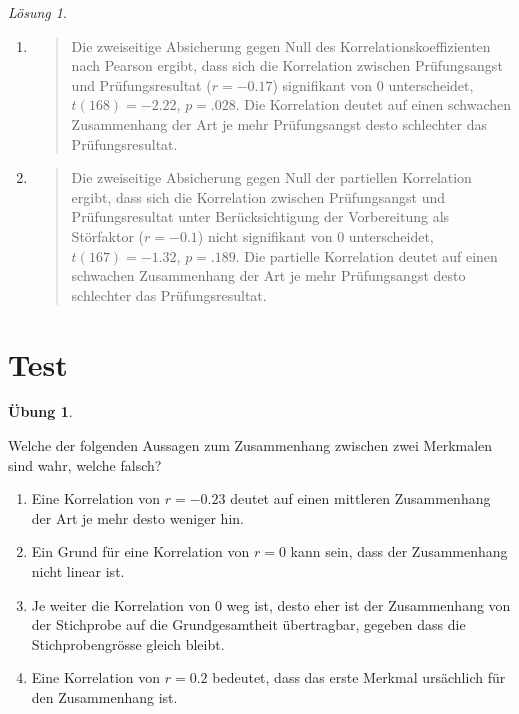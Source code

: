\documentclass[
]{book}
\providecommand{\tightlist}{%
  \setlength{\itemsep}{0pt}\setlength{\parskip}{0pt}}
\theoremstyle{definition}
\theoremstyle{definition}
\theoremstyle{definition}
\newtheorem{exercise}{Übung}[chapter]
\theoremstyle{definition}
\theoremstyle{remark}
\newtheorem*{solution}{Lösung}
\begin{document}
\begin{solution}
\begin{enumerate}
\def\labelenumi{\alph{enumi})}
\item
  \begin{quote}
  Die zweiseitige Absicherung gegen Null des Korrelationskoeffizienten nach Pearson ergibt, dass sich die Korrelation zwischen Prüfungsangst und Prüfungsresultat (\(r = -0.17\)) signifikant von \(0\) unterscheidet, \(t(168) = -2.22\), \(p = .028\). Die Korrelation deutet auf einen schwachen Zusammenhang der Art je mehr Prüfungsangst desto schlechter das Prüfungsresultat.
  \end{quote}
\item
  \begin{quote}
  Die zweiseitige Absicherung gegen Null der partiellen Korrelation ergibt, dass sich die Korrelation zwischen Prüfungsangst und Prüfungsresultat unter Berücksichtigung der Vorbereitung als Störfaktor (\(r = -0.1\)) nicht signifikant von \(0\) unterscheidet, \(t(167) = -1.32\), \(p = .189\). Die partielle Korrelation deutet auf einen schwachen Zusammenhang der Art je mehr Prüfungsangst desto schlechter das Prüfungsresultat.
  \end{quote}
\end{enumerate}

\end{solution}

\section{Test}\label{test-4}

\begin{exercise}
\protect\hypertarget{exr:test-theorie-korrelation}{}\label{exr:test-theorie-korrelation}

Welche der folgenden Aussagen zum Zusammenhang zwischen zwei Merkmalen sind wahr, welche falsch?

\begin{enumerate}
\def\labelenumi{\alph{enumi})}
\tightlist
\item
  Eine Korrelation von \(r = -0.23\) deutet auf einen mittleren Zusammenhang der Art je mehr desto weniger hin.
\item
  Ein Grund für eine Korrelation von \(r=0\) kann sein, dass der Zusammenhang nicht linear ist.
\item
  Je weiter die Korrelation von \(0\) weg ist, desto eher ist der Zusammenhang von der Stichprobe auf die Grundgesamtheit übertragbar, gegeben dass die Stichprobengrösse gleich bleibt.
\item
  Eine Korrelation von \(r = 0.2\) bedeutet, dass das erste Merkmal ursächlich für den Zusammenhang ist.
\end{enumerate}

\end{exercise}
\end{document}
